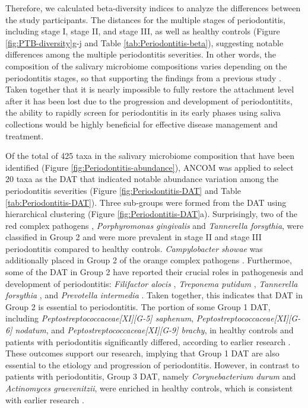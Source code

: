 \documentclass[11pt, a4paper, onecolumn, oneside]{report}
\begin{document}
            Therefore, we calculated beta-diversity indices to analyze the differences between the study participants. The distances for the multiple stages of periodontitis, including stage I, stage II, and stage III, as well as healthy controls (Figure \ref{fig:PTB-diversity}g-j and Table \ref{tab:Periodontitis-beta}), suggesting notable differences among the multiple periodontitis severities. In other words, the composition of the salivary microbiome compositions varies depending on the periodontitis stages, so that supporting the findings from a previous study \cite{Periodontitis-10}. Taken together that it is nearly impossible to fully restore the attachment level after it has been lost due to the progression and development of periodontitits, the ability to rapidly screen for periodontitis in its early phases using saliva collections would be highly beneficial for effective disease management and treatment.

            Of the total of 425 taxa in the salivary microbiome composition that have been identified (Figure \ref{fig:Periodontitis-abundance}), ANCOM was applied to select 20 taxa as the DAT that indicated notable abundance variation among the periodontitis severities (Figure \ref{fig:Periodontitis-DAT} and Table \ref{tab:Periodontitis-DAT}). Three sub-groups were formed from the DAT using hierarchical clustering (Figure \ref{fig:Periodontitis-DAT}a). Surprisingly, two of the red complex pathogens \cite{Periodontitis-22}, \textit{Porphyromonas gingivalis} and \textit{Tannerella forsythia}, were classified in Group 2 and were more prevalent in stage II and stage III periodontitis compared to healthy controls. \textit{Campylobacter showae} was additionally placed in Group 2 of the orange complex pathogens \cite{Periodontitis-23}. Furthermoe, some of the DAT in Group 2 have reported their crucial roles in pathogenesis and development of periodontitis: \textit{Filifactor alocis} \cite{Periodontitis-24}, \textit{Treponema putidum} \cite{Periodontitis-25}, \textit{Tannerella forsythia} \cite{Periodontitis-26, Periodontitis-27}, and \textit{Prevotella intermedia} \cite{Periodontitis-28}. Taken together, this indicates that DAT in Group 2 is essential to periodontitis. The portion of some Group 1 DAT, including \textit{Peptostreptococcaceae[XI][G-5] saphenum}, \textit{Peptostreptococcaceae[XI][G-6] nodatum}, and \textit{Peptostreptococcaceae[XI][G-9] brachy}, in healthy controls and patients with periodontitis significantly differed, according to earlier research \cite{Periodontitis-8}. These outcomes support our research, implying that Group 1 DAT are also essential to the etiology and progression of periodontitis. However, in contrast to patients with periodontitis, Group 3 DAT, namely \textit{Corynebacterium durum} and \textit{Actinomyces graevenitzii},  were enriched in healthy controls, which is consistent with earlier research \cite{Periodontitis-29, Periodontitis-30}.
\end{document}

